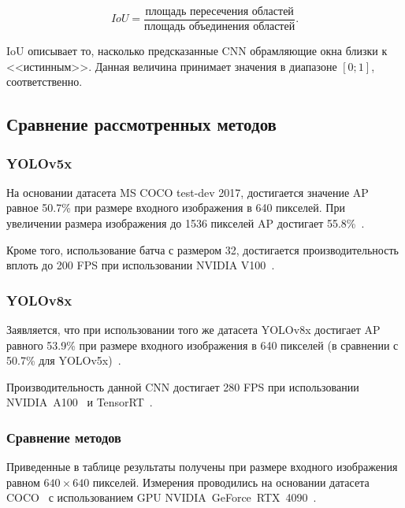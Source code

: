 \begin{equation}
	IoU = \frac{\text{площадь пересечения областей}}{\text{площадь объединения областей}}.
\end{equation}

IoU описывает то, насколько предсказанные CNN обрамляющие окна близки к <<истинным>>. Данная величина принимает значения в диапазоне $[0;1]$, соответственно.

\subsection{Сравнение рассмотренных методов}

\subsubsection*{YOLOv5x}

На основании датасета MS COCO test-dev 2017, достигается значение AP равное 50.7\% при размере входного изображения в 640 пикселей. При увеличении размера изображения до 1536 пикселей AP достигает 55.8\%~\cite{yolo-review-2023}. 

Кроме того, использование батча с размером 32, достигается производительность вплоть до 200 FPS при использовании NVIDIA V100~\cite{nvidia-v100}.

\subsubsection*{YOLOv8x}

Заявляется, что при использовании того же датасета YOLOv8x достигает AP равного 53.9\% при размере входного изображения в 640 пикселей (в сравнении с 50.7\% для YOLOv5x)~\cite{yolo-review-2023}.

Производительность данной CNN достигает 280 FPS при использовании NVIDIA~A100~\cite{nvidia-a100} и TensorRT~\cite{nvidia-tensorrt}.

\subsubsection*{Сравнение методов}

Приведенные в таблице результаты получены при размере входного изображения равном $640 \times 640$ пикселей. Измерения проводились на основании датасета COCO~\cite{coco-benchmark} с использованием GPU NVIDIA~GeForce~RTX~4090~\cite{rtx4090}.


